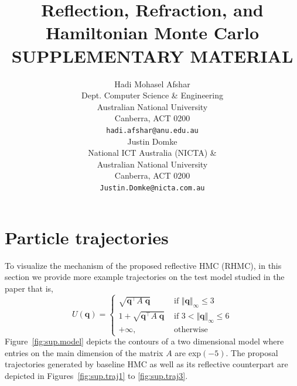\documentclass{article} %
\title{Reflection, Refraction, and Hamiltonian Monte Carlo\\\vspace{8pt}SUPPLEMENTARY MATERIAL}
\author{
Hadi Mohasel Afshar %
\\
Dept. Computer Science \& Engineering \\
Australian National University\\
Canberra, ACT 0200\\
\texttt{hadi.afshar@anu.edu.au} \\
\And
Justin Domke\\
National ICT Australia (NICTA) \& \\Australian National University\\
Canberra, ACT 0200\\
\texttt{Justin.Domke@nicta.com.au}
}
\newcommand{\bvec}[1]{\textbf{#1}}
\newcommand{\case}[2]{#2 &\text{ if } #1}%
\newcommand{\otherwise}[1]{#1 &\text{ otherwise}}
\begin{document}
\maketitle

\section{Particle trajectories}
To visualize the mechanism of the proposed reflective HMC (RHMC), in this section we provide more example trajectories on the test model studied in the paper that is,
\[
U(\bvec{q}) =
\begin{cases}
\case{\Vert \bvec{q} \Vert_\infty \leq 3}{\sqrt{\bvec{q}^\top A \; \bvec{q}}}\\
\case{3 < \Vert \bvec{q} \Vert_\infty \leq 6 }{1 + \sqrt{\bvec{q}^\top A \; \bvec{q}}}\\
\otherwise{+ \infty,}
\end{cases}
\] 
Figure~\ref{fig:sup.model} depicts the contours of a two dimensional model where entries on the main dimension of the matrix $A$ are exp$(-5)$. 
The proposal trajectories generated by baseline HMC as well as its reflective counterpart are depicted in Figures~\ref{fig:sup.traj1} to \ref{fig:sup.traj3}.

\vspace{1.5cm}
\end{document}
